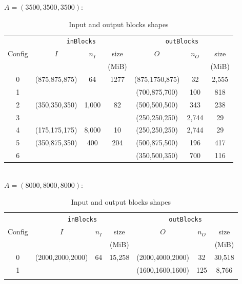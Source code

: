 \documentclass[sigconf, nonacm]{acmart}
\begin{document}
\begin{table}
  \setlength{\tabcolsep}{1pt}
  \centering
  \caption{Input and output blocks shapes}
  $A=(3500,3500,3500)$:\\
   \begin{tabular}{c|ccc|ccc}
   \rowcolor{black!25}
          & \multicolumn{3}{c|}{\texttt{inBlocks}} & \multicolumn{3}{c}{\texttt{outBlocks}} \\
    \rowcolor{black!25}
  Config &      $I$      & $n_I$  & size &      $O$       & $n_O$  & size  \\
  \rowcolor{black!25}
     &               &        & (MiB)&                &        & (MiB) \\
   \hline
   0 & (875,875,875) & 64     & 1277    & (875,1750,875) & 32     &  2,555 \\
   1 &               &        &           & (700,875,700)  & 100    & 818 \\
   \rowcolor{black!10}
   2 & (350,350,350) &1,000   & 82        & (500,500,500)  & 343    & 238 \\
   \rowcolor{black!10}
   3 &               &        &           & (250,250,250)  & 2,744  & 29  \\
   4 & (175,175,175) &8,000   & 10        & (250,250,250)  & 2,744  & 29 \\
   \rowcolor{black!10}
   5 & (350,875,350) &400     & 204       & (500,875,500)  & 196    & 417 \\
   \rowcolor{black!10}
   6 &               &        &           & (350,500,350)  & 700    & 116 \\
   \end{tabular}
   \vspace*{0.2cm}\\
   $A=(8000,8000,8000)$:
   \begin{tabular}{c|ccc|ccc}
   \rowcolor{black!25}
          & \multicolumn{3}{c|}{\texttt{inBlocks}} & \multicolumn{3}{c}{\texttt{outBlocks}} \\
    \rowcolor{black!25}
  Config &      $I$      & $n_I$  & size &      $O$       & $n_O$  & size  \\
  \rowcolor{black!25}
     &               &        & (MiB)&                &        & (MiB) \\
   \hline
   0 & (2000,2000,2000) & 64     & 15,258    & (2000,4000,2000) & 32     &  30,518 \\
   1 &               &        &           & (1600,1600,1600)  & 125    & 8,766 \\
   \rowcolor{black!10}

\end{tabular}
\end{table}
\end{document}
